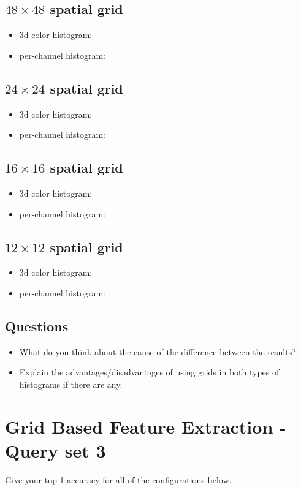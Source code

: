 \documentclass[12pt]{article}
\begin{document}
\subsection{$48\times48$ spatial grid}
\begin{itemize}
\item 3d color histogram:
\item per-channel histogram:
\end{itemize}

\subsection{$24\times24$ spatial grid}
\begin{itemize}
\item 3d color histogram:
\item per-channel histogram:
\end{itemize}

\subsection{$16\times16$ spatial grid}
\begin{itemize}
\item 3d color histogram:
\item per-channel histogram:
\end{itemize}

\subsection{$12\times12$ spatial grid}
\begin{itemize}
\item 3d color histogram:
\item per-channel histogram:
\end{itemize}

\subsection{Questions}
\begin{itemize}
\item What do you think about the cause of the difference between the results?
\item Explain the advantages/disadvantages of using grids in both types of histograms if there are any.
\end{itemize}


\section{Grid Based Feature Extraction - Query set 3}
Give your top-1 accuracy for all of the configurations below.
\end{document}
